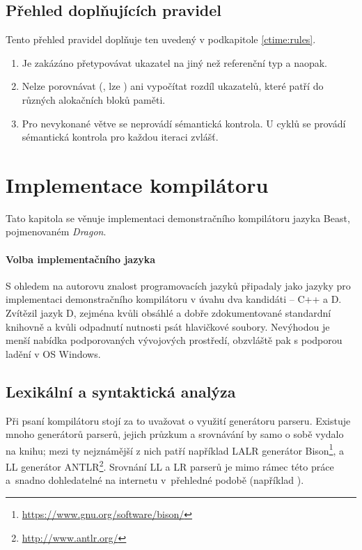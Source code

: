 \section{Přehled doplňujících pravidel} \label{ctime:moreRules}
Tento přehled pravidel doplňuje ten uvedený v podkapitole \ref{ctime:rules}.

\begin{enumerate}
	\item Je zakázáno přetypovávat \ctime ukazatel na jiný než referenční \ctime typ a naopak.
	\item Nelze porovnávat (\inlineCode{< > <= >=}, lze ) ani vypočítat rozdíl \ctime ukazatelů, které patří do různých alokačních bloků paměti.
	\item Pro nevykonané \ctime větve se neprovádí sémantická kontrola. U \ctime cyklů se provádí sémantická kontrola pro každou iteraci zvlášť.
\end{enumerate}

\chapter{Implementace kompilátoru} \label{chap:compiler}
Tato kapitola se věnuje implementaci demonstračního kompilátoru jazyka Beast, pojmenovaném \textit{Dragon}.

\subsubsection{Volba implementačního jazyka}
S ohledem na autorovu znalost programovacích jazyků připadaly jako jazyky pro implementaci demonstračního kompilátoru v úvahu dva kandidáti -- C++ a D. Zvítězil jazyk D, zejména kvůli obsáhlé a dobře zdokumentované standardní knihovně a kvůli odpadnutí nutnosti psát hlavičkové soubory. Nevýhodou je menší nabídka podporovaných vývojových prostředí, obzvláště pak s podporou ladění v OS Windows.

\section{Lexikální a syntaktická analýza}
Při psaní kompilátoru stojí za to uvažovat o využití generátoru parseru. Existuje mnoho generátorů parserů, jejich průzkum a srovnávání by samo o sobě vydalo na knihu; mezi ty nejznámější z nich patří například LALR generátor Bison\footnote{\url{https://www.gnu.org/software/bison/}}, a LL generátor ANTLR\footnote{\url{http://www.antlr.org/}}. Srovnání LL a LR parserů je mimo rámec této práce a~snadno dohledatelné na internetu v~přehledné podobě (například \cite{LLLRComp}).

